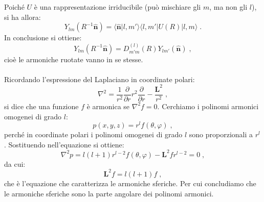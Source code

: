 \documentclass[10pt,a4paper]{report}
\theoremstyle{definition}
\numberwithin{equation}{section}
\newcommand{\bra}{\langle}
\newcommand{\ket}{\rangle}
\begin{document}
Poiché $U$ è una rappresentazione irriducibile (può mischiare gli $m$, ma non gli $l$), si ha allora:
\begin{equation}
Y_{lm}(R^{-1}\hat{\mathbf{n}})=\bra\hat{\mathbf{n}}|l,m'\ket\bra l,m'|U(R)|l,m\ket\;.
\end{equation}
In conclusione si ottiene:
\begin{equation}
Y_{lm}(R^{-1}\hat{\mathbf{n}})=D^{(l)}_{m'm}(R)Y_{lm'}(\hat{\mathbf{n}})\;,
\end{equation}
cioè le armoniche ruotate vanno in se stesse. \\
\\
Ricordando l'espressione del Laplaciano in coordinate polari:
\begin{equation}
\nabla^2=\frac{1}{r^2}\frac{\partial}{\partial r}r^2\frac{\partial}{\partial r}-\frac{\mathbf{L}^2}{r^2}\;,
\end{equation}
si dice che una funzione $f$ è armonica se $\nabla^2f=0$. Cerchiamo i polinomi armonici omogenei di grado $l$:
\begin{equation}
p(x,y,z)=r^l f(\theta,\varphi)\;,
\end{equation}
perché in coordinate polari i polinomi omogenei di grado $l$ sono proporzionali a $r^l$. Sostituendo nell'equazione si ottiene:
\begin{equation}
\nabla^2p=l(l+1)r^{l-2}f(\theta,\varphi)-\mathbf{L}^2 f r^{l-2}=0\;,
\end{equation}
da cui:
\begin{equation}
\mathbf{L}^2f=l(l+1)f\;,
\end{equation}
che è l'equazione che caratterizza le armoniche sferiche. Per cui concludiamo che le armoniche sferiche sono la parte angolare dei polinomi armonici.
\end{document}
